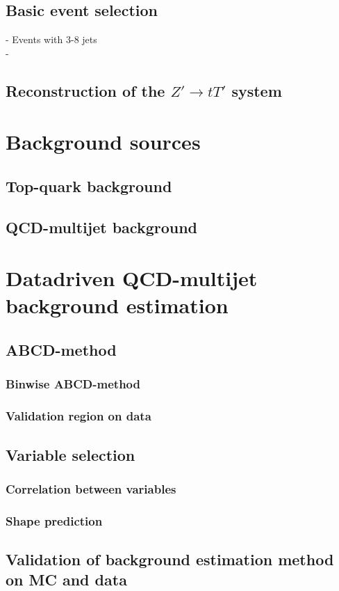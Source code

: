 \subsection{Basic event selection}
- Events with 3-8 jets\\
- \\
\subsection{Reconstruction of the $Z'\rightarrow tT'$ system}

\section{Background sources}
\subsection{Top-quark background}
\subsection{QCD-multijet background}

\section{Datadriven QCD-multijet background estimation}
\subsection{ABCD-method}
\subsubsection{Binwise ABCD-method}
\subsubsection{Validation region on data}
\subsection{Variable selection}
\subsubsection{Correlation between variables}
\subsubsection{Shape prediction}
\subsection{Validation of background estimation method on MC and data}
